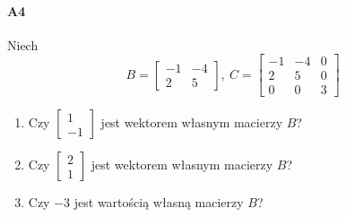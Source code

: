 \documentclass[a4paper,12pt]{article}
\theoremstyle{definition}%
\theoremstyle{definition}
\theoremstyle{problem}
\begin{document}
\paragraph{A4}
Niech
$$B = \begin{bmatrix}
-1 & -4\\
2 & 5
\end{bmatrix},\ C=\begin{bmatrix}
-1 & -4& 0\\
2&5&0\\
0&0&3
\end{bmatrix}$$
\begin{enumerate}[label=\alph*)]
\item Czy $\begin{bmatrix}
1\\-1
\end{bmatrix}$ jest wektorem własnym macierzy $B$?
\item Czy $\begin{bmatrix}
2\\1
\end{bmatrix}$ jest wektorem własnym macierzy $B$?
\item Czy $-3$ jest wartością własną macierzy $B$?


\end{enumerate}
\end{document}
